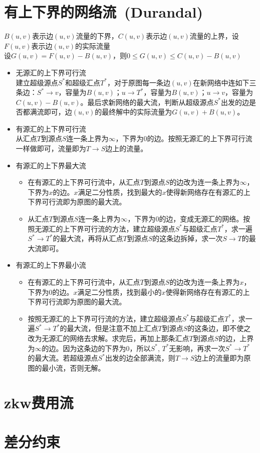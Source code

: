 \section{有上下界的网络流\ \small(Durandal)}
	$ B(u, v) $表示边$ (u, v) $流量的下界，$ C(u, v) $表示边$ (u, v) $流量的上界，设$ F(u, v) $表示边$ (u, v) $的实际流量\\
	设$ G(u, v) = F(u, v) - B(u, v) $，则$ 0 \leq G(u, v) \leq C(u, v) - B(u, v) $
	\begin{itemize}
		\item 无源汇的上下界可行流
			\\建立超级源点$ S^\ast $和超级汇点$ T^\ast $，对于原图每一条边$ (u, v) $在新网络中连如下三条边：$ S^\ast \to v $，容量为$ B(u, v) $；$ u \to T^\ast $，容量为$ B(u, v) $；$ u \to v $，容量为$ C(u, v) - B(u, v) $。最后求新网络的最大流，判断从超级源点$ S^\ast $出发的边是否都满流即可，边$ (u, v) $的最终解中的实际流量为$ G(u, v) + B(u, v) $。
		\item 有源汇的上下界可行流
			\\从汇点$ T $到源点$ S $连一条上界为$ \infty $，下界为$ 0 $的边。按照无源汇的上下界可行流一样做即可，流量即为$ T \to S $边上的流量。
		\item 有源汇的上下界最大流
			\begin{itemize}
				\item 在有源汇的上下界可行流中，从汇点$ T $到源点$ S $的边改为连一条上界为$ \infty $，下界为$ x $的边。$ x $满足二分性质，找到最大的$ x $使得新网络存在有源汇的上下界可行流即为原图的最大流。
				\item 从汇点$ T $到源点$ S $连一条上界为$ \infty $，下界为$ 0 $的边，变成无源汇的网络。按照无源汇的上下界可行流的方法，建立超级源点$ S^\ast $与超级汇点$ T^\ast $，求一遍$ S^\ast \to T^\ast $的最大流，再将从汇点$ T $到源点$ S $的这条边拆掉，求一次$ S \to T $的最大流即可。
			\end{itemize}
		\item 有源汇的上下界最小流
			\begin{itemize}
				\item 在有源汇的上下界可行流中，从汇点$ T $到源点$ S $的边改为连一条上界为$ x $，下界为$ 0 $的边。$ x $满足二分性质，找到最小的$ x $使得新网络存在有源汇的上下界可行流即为原图的最大流。
				\item 按照无源汇的上下界可行流的方法，建立超级源点$ S^\ast $与超级汇点$ T^\ast $，求一遍$ S^\ast \to T^\ast $的最大流，但是注意不加上汇点$ T $到源点$ S $的这条边，即不使之改为无源汇的网络去求解。求完后，再加上那条汇点$ T $到源点$ S $的边，上界为$ \infty $的边。因为这条边的下界为$ 0 $，所以$ S^\ast $, $ T^\ast $无影响，再求一次$ S^\ast \to T^\ast $的最大流。若超级源点$ S^\ast $出发的边全部满流，则$ T \to S $边上的流量即为原图的最小流，否则无解。
			\end{itemize}
	\end{itemize}
\section{zkw费用流}
\section{差分约束}